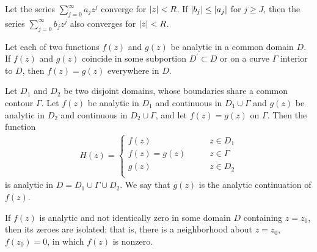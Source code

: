     \begin{thm}
        Let the series $\sum_{j=0}^\infty a_j z^j$ converge for $\left\lvert z \right\rvert <
        R$. If $\left\lvert b_j \right\rvert \le \left\lvert a_j \right\rvert$ for $j \ge J$, then the series
        $\sum_{j=0}^\infty b_j z^j$ also converges for $\left\lvert z \right\rvert < R$.
    \end{thm}

    \begin{thm}
        Let each of two functions $f(z)$ and $g(z)$ be analytic in a common
        domain $D$. If $f(z)$ and $g(z)$ coincide in some subportion
        $D^\prime \subset D$ or on a curve $\Gamma$ interior to $D$, then
        $f(z) = g(z)$ everywhere in $D$.
    \end{thm}

    \begin{thm}
        Let $D_1$ and $D_2$ be two disjoint domains, whose boundaries share
        a common contour $\Gamma$. Let $f(z)$ be analytic in $D_1$ and
        continuous in $D_1 \cup \Gamma$ and $g(z)$ be analytic in $D_2$ and
        continuous in $D_2 \cup \Gamma$, and let $f(z) = g(z)$ on $\Gamma$.
        Then the function
        \begin{align*}
            H(z) = \begin{cases}
                f(z) \qquad & z \in D_1\\
                f(z) = g(z) \qquad & z \in \Gamma\\
                g(z) \qquad & z \in D_2\\
            \end{cases}
        \end{align*}
        is analytic in $D = D_1 \cup \Gamma \cup D_2$. We say that $g(z)$ is
        the analytic continuation of $f(z)$.
    \end{thm}

    \begin{thm}
        If $f(z)$ is analytic and not identically zero in some domain $D$
        containing $z=z_0$, then its zeroes are isolated; that is, there is
        a neighborhood about $z=z_0$, $f(z_0)=0$, in which $f(z)$ is
        nonzero.
    \end{thm}

